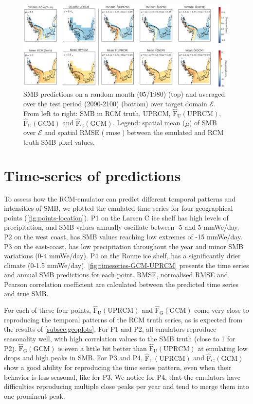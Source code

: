 \documentclass[a4paper,11pt,oneside]{report}
\begin{document}
\begin{figure}[thb]
  \centering
  \includegraphics[width=\columnwidth]{doc/Thesis-latex/images/results/geoplots_RCM_GCM.pdf}
  \caption []{\small SMB predictions on a random month (05/1980) (top) and averaged over the test period (2090-2100) (bottom) over target domain $\mathcal{E}$. From left to right: SMB in RCM truth, UPRCM, $\operatorname{\hat{F}_{U}(UPRCM)}$, $\operatorname{\hat{F}_{U}(GCM)}$ and $\operatorname{\hat{F}_{G}(GCM)}$. Legend: spatial mean ($\mu$) of SMB over $\mathcal{E}$ and spatial RMSE ($\operatorname{rmse}$) between the emulated and RCM truth SMB pixel values.}
  \vspace{-3mm}
  \label{fig:geoplots-GCM-RCM}
\end{figure}

\section{Time-series of predictions}\label{sec:res-time-series}
To assess how the RCM-emulator can predict different temporal patterns and intensities of SMB, we plotted the emulated time series for four geographical points (\autoref{fig:points-location}). P1 on the Larsen C ice shelf has high levels of precipitation, and SMB values annually oscillate between -5 and 5 \si{mmWe/day}. P2 on the west coast, has SMB values reaching low extremes of -15 \si{mmWe/day}. P3 on the east-coast, has low precipitation throughout the year and minor SMB variations (0-4 \si{mmWe/day}). P4 on the Ronne ice shelf, has a significantly drier climate (0-1.5 \si{mmWe/day}). \autoref{fig:timeseries-GCM-UPRCM} presents the time series and annual SMB predictions for each point. RMSE, normalised RMSE and Pearson correlation coefficient are calculated between the predicted time series and true SMB. 

For each of these four points, $\mathrm{\hat{F}_{U}(UPRCM)}$ and $\mathrm{\hat{F}_{G}(GCM)}$ come very close to reproducing the temporal patterns of the RCM truth series, as is expected from the results of \autoref{subsec:geoplots}. For P1 and P2, all emulators reproduce seasonality well, with high correlation values to the SMB truth (close to 1 for P2). $\mathrm{\hat{F}_{G}(GCM)}$ is even a little bit better than $\mathrm{\hat{F}_{U}(UPRCM)}$ at emulating low drops and high peaks in SMB. For P3 and P4, $\mathrm{\hat{F}_{U}(UPRCM)}$ and $\mathrm{\hat{F}_{G}(GCM)}$ show a good ability for reproducing the time series pattern, even when their behavior is less seasonal, like for P3. We notice for P4, that the emulators have difficulties reproducing multiple close peaks per year and tend to merge them into one prominent peak. 
\end{document}
